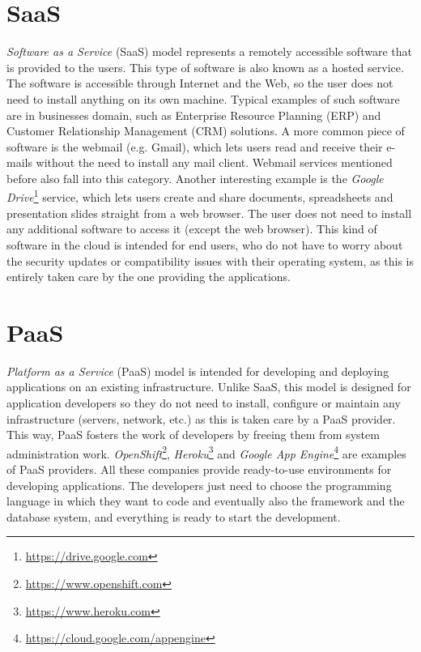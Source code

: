 \section{SaaS}
\textit{Software as a Service} (SaaS) model represents a remotely accessible software that is provided to the users. 
This type of software is also known as a hosted service. 
The software is accessible through Internet and the Web, so the user does not need to install anything on its own machine. 
Typical examples of such software are in businesses domain, such as Enterprise Resource Planning (ERP) and Customer Relationship Management (CRM) solutions. 
A more common piece of software is the webmail (e.g. Gmail), which lets users read and receive their e-mails without the need to install any mail client. 
Webmail services mentioned before also fall into this category. 
Another interesting example is the \textit{Google Drive}\footnote{\url{https://drive.google.com}} service, which lets users create and share documents, spreadsheets and presentation slides straight from a web browser. 
The user does not need to install any additional software to access it (except the web browser). 
This kind of software in the cloud is intended for end users, who do not have to worry about the security updates or compatibility issues with their operating system, as this is entirely taken care by the one providing the applications.


\section{PaaS}
 \textit{Platform as a Service} (PaaS) model is intended for developing and deploying applications on an existing infrastructure.
Unlike SaaS, this model is designed for application developers so they do not need to install, configure or maintain any infrastructure (servers, network, etc.) as this is taken care by a PaaS provider. 
This way, PaaS fosters the work of developers by freeing them from system administration work. 
\textit{OpenShift}\footnote{\url{https://www.openshift.com}}, \textit{Heroku}\footnote{\url{https://www.heroku.com}} and \textit{Google App Engine}\footnote{\url{https://cloud.google.com/appengine}} are examples of PaaS providers.
All these companies provide ready-to-use environments for developing applications.
The developers just need to choose the programming language in which they want to code and eventually also the framework and the database system, and everything is ready to start the development.




